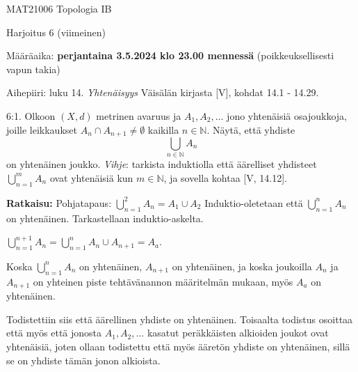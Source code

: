 \documentclass[12pt,a4paper,leqno]{amsart}
\begin{document}
\noindent MAT21006 Topologia IB

\noindent Harjoitus 6 (viimeinen)

\noindent  Määräaika:  \textbf{perjantaina 3.5.2024 klo 23.00 mennessä} (poikkeuksellisesti vapun takia)
\begin{comment}
\bigskip

\noindent Ratkaisut palautetaan sähköisesti määräaikaan mennessä kurssin Moodle sivun viikottaiseen palautusalueeseen yhtenä (1) pdf-lähetyksenä. 

\smallskip

\textbf{Viimeisen viikon 29.4-3.5 luennot ja ohjaukset}: 

$\star$ luennot  maanantaina 29.4 klo 14-16 salissa CK112 ja torstaina 2.5 klo 14-16 salissa C222 (vapunpäivän korvaava luento).

$\star$ ohjausvuorot: tiistaina 30.4  klo 14.15-16  salissa  C322 ja  perjantaina 3.5   klo 14-16 Ratkomossa  (kurssin Topologia IB ohjaaja).
Muina aikoina voi  kysyä  neuvoja tehtäviin Ratkomossa tai kurssin Moodle sivun Keskustelualueissa. Kurssin Topologia IA
Telegram-ryhmä jatkaa. 
\end{comment}
\medskip

Aihepiiri: luku 14. \textit{Yhtenäisyys} Väisälän kirjasta [V], kohdat 14.1 - 14.29.

\bigskip

6:1. Olkoon $(X,d)$ metrinen avaruus ja $A_1, A_2, \ldots$ 
jono yhtenäisiä osajoukkoja,  joille leikkaukset
$A_n \cap A_{n+1} \neq \emptyset$ kaikilla $n \in \mathbb N$. Näytä, että yhdiste
\[
\bigcup_{n \in \mathbb N} A_n
\]
on yhtenäinen joukko.  \textit{Vihje}:  tarkista induktiolla että 
äärelliset yhdisteet  $\bigcup_{n = 1}^m A_n$ ovat yhtenäisiä kun $m \in \mathbb N$, ja sovella 
kohtaa [V, 14.12].

\textbf{Ratkaisu: }
Pohjatapaus:
$\bigcup_{n = 1}^2 A_n = A_1 \cup A_2$
Induktio-oletetaan että $\bigcup_{n = 1}^n A_n$ on yhtenäinen.
Tarkastellaan induktio-askelta.

$\bigcup_{n = 1}^{n+1} A_{n} = \bigcup_{n = 1}^{n} A_n \cup A_{n + 1} = A_a$.

Koska $\bigcup_{n = 1}^{n} A_n$ on yhtenäinen, $A_{n+1}$ on yhtenäinen, ja koska joukoilla $A_n$ ja $A_{n+1}$ on yhteinen piste tehtävänannon määritelmän mukaan, myös $A_a$ on yhtenäinen.

Todistettiin siis että äärellinen yhdiste on yhtenäinen. Toisaalta todistus osoittaa että myös että jonosta $A_1, A_2, ...$ kasatut peräkkäisten alkioiden joukot ovat yhtenäisiä, joten ollaan todistettu että myös ääretön yhdiste on yhtenäinen, sillä se on yhdiste tämän jonon alkioista.
\end{document}
